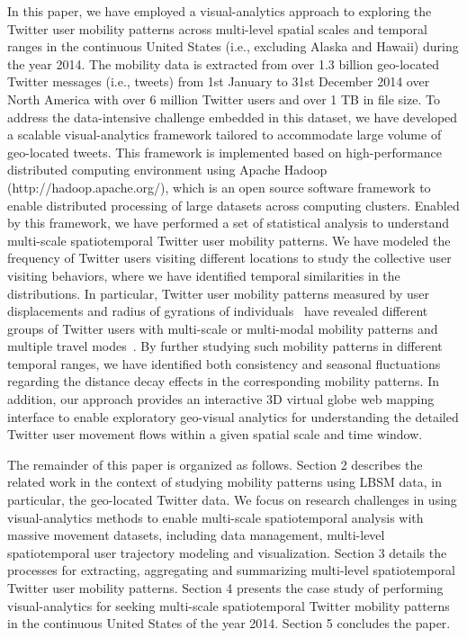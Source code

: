 \documentclass[ijgi,article,accept,moreauthors,pdftex,10pt,a4paper]{mdpi}
\theoremstyle{mdpi}
\newcounter{ex}
\newcounter{re}
\theoremstyle{mdpidefinition}
\begin{document}
In this paper, we have employed a visual-analytics approach to exploring the Twitter user mobility patterns across multi-level spatial scales and temporal ranges in the continuous United States (i.e., excluding Alaska and Hawaii) during the year 2014.
The mobility data is extracted from over 1.3 billion geo-located Twitter messages (i.e., tweets) from 1st January to 31st December 2014 over North America with over 6 million Twitter users and over 1 TB in file size.
To address the data-intensive challenge embedded in this dataset, we have developed a scalable visual-analytics framework tailored to accommodate large volume of geo-located tweets.
This framework is implemented based on high-performance distributed computing environment using Apache Hadoop (http://hadoop.apache.org/), which is an open source software framework to enable distributed processing of large datasets across computing clusters.
Enabled by this framework, we have performed a set of statistical analysis to understand multi-scale spatiotemporal Twitter user mobility patterns. 
We have modeled the frequency of Twitter users visiting different locations to study the collective user visiting behaviors, where we have identified temporal similarities in the distributions.
In particular, Twitter user mobility patterns measured by user displacements and radius of gyrations of individuals~\cite{gonzalez2008understanding} have revealed different groups of Twitter users with multi-scale or multi-modal mobility patterns and multiple travel modes~\cite{Jurdak2015}.
By further studying such mobility patterns in different temporal ranges, we have identified both consistency and seasonal fluctuations regarding the distance decay effects in the corresponding mobility patterns.
In addition, our approach provides an interactive 3D virtual globe web mapping interface to enable exploratory geo-visual analytics for understanding the detailed Twitter user movement flows within a given spatial scale and time window.

The remainder of this paper is organized as follows.
Section 2 describes the related work in the context of studying mobility patterns using LBSM data, in particular, the geo-located Twitter data.
We focus on research challenges in using visual-analytics methods to enable multi-scale spatiotemporal analysis with massive movement datasets, including data management, multi-level spatiotemporal user trajectory modeling and visualization.
Section 3 details the processes for extracting, aggregating and summarizing multi-level spatiotemporal Twitter user mobility patterns.
Section 4 presents the case study of performing visual-analytics for seeking multi-scale spatiotemporal Twitter mobility patterns in the continuous United States of the year 2014.
Section 5 concludes the paper.
\end{document}

